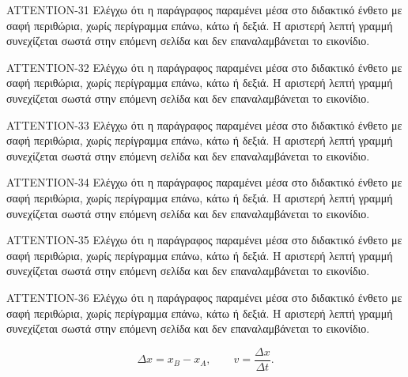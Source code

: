 \begin{AttentionBox}
ATTENTION-31 Ελέγχω ότι η παράγραφος παραμένει μέσα στο διδακτικό ένθετο με σαφή περιθώρια, χωρίς περίγραμμα επάνω, κάτω ή δεξιά. Η αριστερή λεπτή γραμμή συνεχίζεται σωστά στην επόμενη σελίδα και δεν επαναλαμβάνεται το εικονίδιο.\par
ATTENTION-32 Ελέγχω ότι η παράγραφος παραμένει μέσα στο διδακτικό ένθετο με σαφή περιθώρια, χωρίς περίγραμμα επάνω, κάτω ή δεξιά. Η αριστερή λεπτή γραμμή συνεχίζεται σωστά στην επόμενη σελίδα και δεν επαναλαμβάνεται το εικονίδιο.\par
ATTENTION-33 Ελέγχω ότι η παράγραφος παραμένει μέσα στο διδακτικό ένθετο με σαφή περιθώρια, χωρίς περίγραμμα επάνω, κάτω ή δεξιά. Η αριστερή λεπτή γραμμή συνεχίζεται σωστά στην επόμενη σελίδα και δεν επαναλαμβάνεται το εικονίδιο.\par
ATTENTION-34 Ελέγχω ότι η παράγραφος παραμένει μέσα στο διδακτικό ένθετο με σαφή περιθώρια, χωρίς περίγραμμα επάνω, κάτω ή δεξιά. Η αριστερή λεπτή γραμμή συνεχίζεται σωστά στην επόμενη σελίδα και δεν επαναλαμβάνεται το εικονίδιο.\par
ATTENTION-35 Ελέγχω ότι η παράγραφος παραμένει μέσα στο διδακτικό ένθετο με σαφή περιθώρια, χωρίς περίγραμμα επάνω, κάτω ή δεξιά. Η αριστερή λεπτή γραμμή συνεχίζεται σωστά στην επόμενη σελίδα και δεν επαναλαμβάνεται το εικονίδιο.\par
ATTENTION-36 Ελέγχω ότι η παράγραφος παραμένει μέσα στο διδακτικό ένθετο με σαφή περιθώρια, χωρίς περίγραμμα επάνω, κάτω ή δεξιά. Η αριστερή λεπτή γραμμή συνεχίζεται σωστά στην επόμενη σελίδα και δεν επαναλαμβάνεται το εικονίδιο.\par
\[\Delta x=x_B-x_A,\qquad v=\frac{\Delta x}{\Delta t}.\]
\end{AttentionBox}
\clearpage
